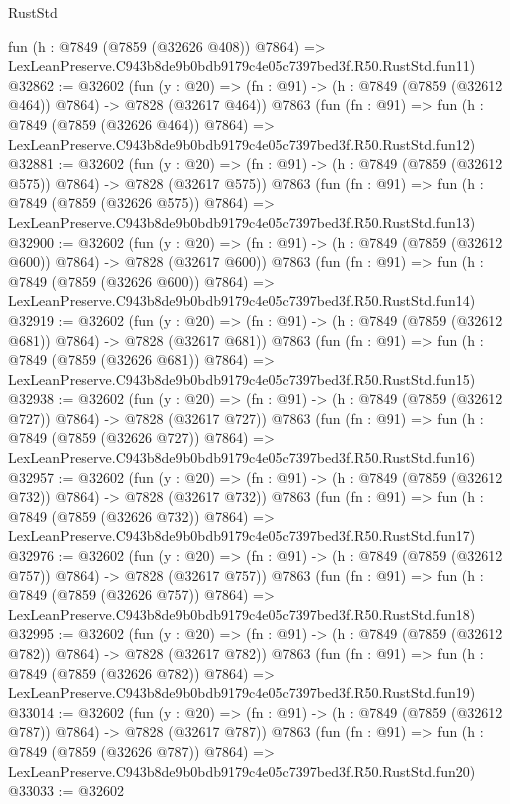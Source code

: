 \begin{lexlean}{RustStd}
\begin{coremodule}
    fun (h : @7849 (@7859 (@32626 @408)) @7864) =>
    LexLeanPreserve.C943b8de9b0bdb9179c4e05c7397bed3f.R50.RustStd.fun11)
@32862 := @32602
    (fun (y : @20) => (fn : @91) -> (h : @7849 (@7859 (@32612 @464)) @7864) -> @7828 (@32617 @464))
    @7863
    (fun (fn : @91) =>
    fun (h : @7849 (@7859 (@32626 @464)) @7864) =>
    LexLeanPreserve.C943b8de9b0bdb9179c4e05c7397bed3f.R50.RustStd.fun12)
@32881 := @32602
    (fun (y : @20) => (fn : @91) -> (h : @7849 (@7859 (@32612 @575)) @7864) -> @7828 (@32617 @575))
    @7863
    (fun (fn : @91) =>
    fun (h : @7849 (@7859 (@32626 @575)) @7864) =>
    LexLeanPreserve.C943b8de9b0bdb9179c4e05c7397bed3f.R50.RustStd.fun13)
@32900 := @32602
    (fun (y : @20) => (fn : @91) -> (h : @7849 (@7859 (@32612 @600)) @7864) -> @7828 (@32617 @600))
    @7863
    (fun (fn : @91) =>
    fun (h : @7849 (@7859 (@32626 @600)) @7864) =>
    LexLeanPreserve.C943b8de9b0bdb9179c4e05c7397bed3f.R50.RustStd.fun14)
@32919 := @32602
    (fun (y : @20) => (fn : @91) -> (h : @7849 (@7859 (@32612 @681)) @7864) -> @7828 (@32617 @681))
    @7863
    (fun (fn : @91) =>
    fun (h : @7849 (@7859 (@32626 @681)) @7864) =>
    LexLeanPreserve.C943b8de9b0bdb9179c4e05c7397bed3f.R50.RustStd.fun15)
@32938 := @32602
    (fun (y : @20) => (fn : @91) -> (h : @7849 (@7859 (@32612 @727)) @7864) -> @7828 (@32617 @727))
    @7863
    (fun (fn : @91) =>
    fun (h : @7849 (@7859 (@32626 @727)) @7864) =>
    LexLeanPreserve.C943b8de9b0bdb9179c4e05c7397bed3f.R50.RustStd.fun16)
@32957 := @32602
    (fun (y : @20) => (fn : @91) -> (h : @7849 (@7859 (@32612 @732)) @7864) -> @7828 (@32617 @732))
    @7863
    (fun (fn : @91) =>
    fun (h : @7849 (@7859 (@32626 @732)) @7864) =>
    LexLeanPreserve.C943b8de9b0bdb9179c4e05c7397bed3f.R50.RustStd.fun17)
@32976 := @32602
    (fun (y : @20) => (fn : @91) -> (h : @7849 (@7859 (@32612 @757)) @7864) -> @7828 (@32617 @757))
    @7863
    (fun (fn : @91) =>
    fun (h : @7849 (@7859 (@32626 @757)) @7864) =>
    LexLeanPreserve.C943b8de9b0bdb9179c4e05c7397bed3f.R50.RustStd.fun18)
@32995 := @32602
    (fun (y : @20) => (fn : @91) -> (h : @7849 (@7859 (@32612 @782)) @7864) -> @7828 (@32617 @782))
    @7863
    (fun (fn : @91) =>
    fun (h : @7849 (@7859 (@32626 @782)) @7864) =>
    LexLeanPreserve.C943b8de9b0bdb9179c4e05c7397bed3f.R50.RustStd.fun19)
@33014 := @32602
    (fun (y : @20) => (fn : @91) -> (h : @7849 (@7859 (@32612 @787)) @7864) -> @7828 (@32617 @787))
    @7863
    (fun (fn : @91) =>
    fun (h : @7849 (@7859 (@32626 @787)) @7864) =>
    LexLeanPreserve.C943b8de9b0bdb9179c4e05c7397bed3f.R50.RustStd.fun20)
@33033 := @32602

\end{coremodule}
\end{lexlean}
